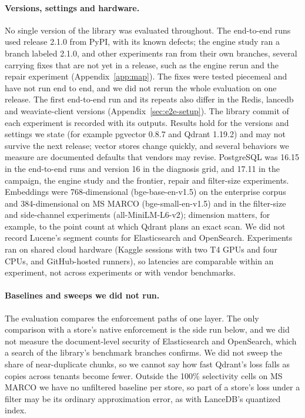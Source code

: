 \paragraph{Versions, settings and hardware.}
No single version of the library was evaluated throughout. The end-to-end runs used release 2.1.0 from
PyPI, with its known defects; the engine study ran a branch labeled 2.1.0, and other experiments ran from their own branches, several carrying fixes that are not yet in a
release, such as the engine rerun and the repair experiment (Appendix~\ref{app:map}). The fixes were tested piecemeal and have not run end to end, and we did not rerun the whole evaluation
on one release. The first end-to-end run and its repeats also differ in the Redis, lancedb and weaviate-client versions (Appendix~\ref{sec:e2e-setup}). The library commit of each experiment is recorded with its outputs. Results hold for the
versions and settings we state (for example pgvector 0.8.7 and Qdrant 1.19.2) and may not survive the
next release; vector stores change quickly, and several behaviors we measure are documented defaults
that vendors may revise. PostgreSQL was 16.15 in the end-to-end runs and version 16 in the diagnosis
grid, and 17.11 in the campaign, the engine study and the frontier, repair and filter-size experiments.
Embeddings were 768-dimensional (bge-base-en-v1.5) on the enterprise corpus and 384-dimensional on MS
MARCO (bge-small-en-v1.5) and in the filter-size and side-channel experiments (all-MiniLM-L6-v2);
dimension matters, for example, to the point count at which Qdrant plans an exact scan. We did not
record Lucene's segment counts for Elasticsearch and OpenSearch. Experiments ran on shared cloud
hardware (Kaggle sessions with two T4 GPUs and four CPUs, and GitHub-hosted runners), so latencies are
comparable within an experiment, not across experiments or with vendor benchmarks.

\paragraph{Baselines and sweeps we did not run.}
The evaluation compares the enforcement paths of one layer. The only comparison with a store's native enforcement is the side run below, and we did not measure the document-level security of Elasticsearch and
OpenSearch, which a search of the library's benchmark branches confirms. We did not sweep the share of near-duplicate
chunks, so we cannot say how fast Qdrant's loss falls as copies across tenants become fewer. Outside the
100\% selectivity cells on MS MARCO we have no unfiltered baseline per store, so part of a store's loss
under a filter may be its ordinary approximation error, as with LanceDB's quantized index.

